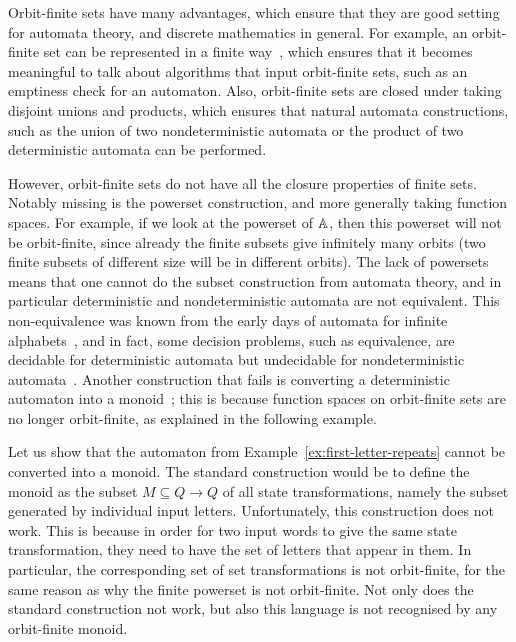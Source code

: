 Orbit-finite sets have many advantages, which ensure that they are good setting for automata theory, and discrete mathematics in general. For example, an orbit-finite set can be represented in a finite way~\cite{bojanczyk_slightly2018}, which ensures that it becomes meaningful to talk about algorithms that input orbit-finite sets, such as an emptiness check for an automaton. Also, orbit-finite sets are closed under taking disjoint unions and products, which ensures that natural automata constructions, such as the union of two nondeterministic automata or the product of two deterministic automata can be performed.

However, orbit-finite sets do not have all the closure properties of finite sets. Notably missing is the powerset construction, and more generally taking function spaces. For example, if we look at the powerset of $\mathbb A$, then this powerset will not be orbit-finite, since already the finite subsets give infinitely many orbits (two finite subsets of different size will be in different orbits). The lack of powersets means that one cannot do the subset construction from automata theory, and in particular deterministic and nondeterministic automata are not equivalent. This non-equivalence was known from the early days of automata for infinite alphabets~\cite{kaminskiFiniteMemoryAutomata1994}, and in fact, some decision problems, such as equivalence, are decidable for deterministic automata but undecidable for nondeterministic automata~\cite{nevenFiniteStateMachines2004}. Another construction that fails is converting a deterministic automaton into a monoid~\cite[p.~221]{bojanczykNominalMonoids2013}; this is because function spaces on orbit-finite sets are no longer orbit-finite, as explained in the following example. 

\begin{example}\label{ex:first-letter-repeats-monoid}
    Let us show that the  automaton from Example~\ref{ex:first-letter-repeats} cannot be converted into a monoid. The standard construction would be to define the monoid as the subset $M \subseteq Q \to Q$ of all state transformations, namely the subset generated by individual input letters. 
    Unfortunately, this construction does not work. This is because in order  for  two input words to give the same state transformation, they need to have the set of letters that appear in them. In particular, the corresponding set of set transformations is not orbit-finite, for the same reason as why the finite powerset is not orbit-finite. Not only does the standard construction not work, but also this language is not recognised by any orbit-finite monoid.\exampleend
\end{example}



